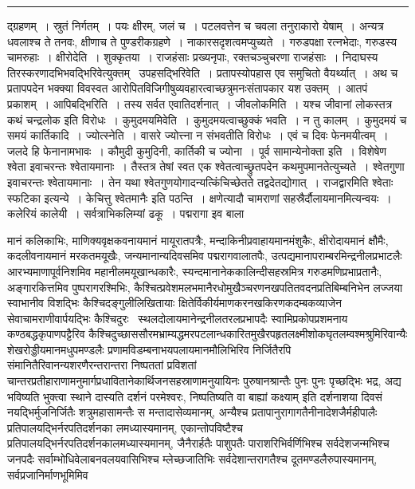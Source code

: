 \documentclass[11pt, openany]{book}
\begin{document}
\vspace{2mm}
\hrule

\noindent
{\s द्ग्रहणम्~। स्रुतं निर्गतम्~। पयः क्षीरम्, जलं च~। पटलवत्तेन च चवला तनुराकारो येषाम्~। अन्यत्र धवलाश्च ते तनवः, क्षीणाच ते पुण्डरीकग्रहणे~। नाकारसदृशत्वमप्युच्यते~। गरुडपक्षा रत्नभेदाः, गरुडस्य चामरुहाः~। {\qtt क्षीरोदेति}~। शुक्कृतया~। राजहंसाः प्रख्यनृपाः, रक्तचञ्चुचरणा राजहंसाः~। निदाघस्य तिरस्करणादभिभवद्भिरिवेत्युक्तम् \textendash\ {\qtt उपहसद्भिरिवेति}~। प्रतापस्योपहास एव समुचितो वैयर्थ्यात्~। अथ च प्रतापपदेन भक्क्या विवस्वत आरोपितविजिगीषुव्यवहारत्वाच्छत्रुमनःसंतापकार यश उक्तम्~। आतपं प्रकाशम्~। {\qtt आपिबद्भिरिति}~। तस्य सर्वत एवातिदर्शनात्~। {\qtt जीवलोकमिति}~। यश्च जीवानां लोकस्तत्र कथं चन्द्रलोक इति विरोधः~। {\qtt कुमुदमयमिवेति}~। कुमुदमयत्वाच्छुक्कं भवति~। न तु कालम्~। कुमुदमयं च समयं कार्तिकादि~। {\qtt ज्योत्स्नेति}~। वासरे ज्योत्त्ना न संभवतीति विरोधः~। एवं च दिवः फेनमयीत्वम्~। जलदे हि फेनानामभावः~। कौमुदी कुमुदिनी, कार्तिकी च ज्योना~। पूर्व सामान्येनोक्ता इति~। विशेषेण श्वेता इवाचरन्तः श्वेतायमानाः~। तैस्तत्र तेषां स्वत एक श्वेतत्वाच्छ्रुतपदेन कथमुपमानतेत्युच्यते~। श्वेतगुणा इवाचरन्तः श्वेतायमानाः~। तेन यथा श्वेतगुणयोगादन्यत्किंचिच्छेतते तद्वदेतद्योगात्~। राजद्वारमिति श्वेताः स्फटिका इत्यन्ये~। केचित्तु {\qt श्वेतमानैः} इति पठन्ति~। क्षणेत्यादौ चामराणां सहस्रैर्दौलायमानमित्यन्वयः~। कलेरियं कालेयी~। सर्वत्राभिकलिम्यां ढकू~। पद्मरागा इव बाला}

\newpage

\noindent
मानं कलिकाभिः, माणिक्यवृक्षकवनायमानं मायूरातपत्रैः, मन्दाकिनीप्रवाहायमानमंशुकैः, क्षीरोदायमानं क्षौमैः, कदलीवनायमानं मरकतमयूखैः, जन्यमानान्यदिवसमिव पद्मरागवालातपैः, उत्पद्यमानापराम्बरमिन्द्रनीलप्रभाटलैः आरभ्यमाणापूर्वनिशमिव महानीलमयूखान्धकारैः, स्यन्दमानानेककालिन्दीसहस्रमित्र गरुडमणिप्रभाप्रतानैः, अङ्गारकित्तमिव पुष्परागरश्मिभिः, कैश्चित्प्रवेशमलभमानैरधोमुखैञ्चरणनखपतितवदनप्रतिबिम्बनिभेन लज्जया स्वाभानीव विशद्भिः कैश्चिदङ्गुलीलिखितायाः क्षितेर्विकीर्यमाणकरनखकिरणकदम्बकव्याजेन सेवाचामराणीवार्पयद्भिः कैश्चिदुरः \textendash\ स्थलदोलायमानेन्द्रनीलतरलप्रभापदैः स्वामिप्रकोपप्रशमनाय कण्ठबद्धकृपाणपट्टैरिव कैश्चिदुच्छाससौरमभ्राम्यद्धमरपटलान्धकारितमुखैरपहृतलक्ष्मीशोकघृतलम्वश्मश्रुमिरिवान्यैः शेखरोड्डीयमानमधुपमण्डलैः प्रणामविडम्बनाभयपलायमानमौलिभिरिव निर्जितैरपि संमानितैरिवानन्यशरणैरन्तरान्तरा निष्पततां प्रविशतां चान्तरप्रतीहाराणामनुमार्गप्रधावितानेकार्थिजनसहस्राणामनुयायिनः पुरुषानश्रान्तैः पुनः पुनः पृच्छद्भिः भद्र, अद्य भविष्यति भुक्त्वा स्थाने दास्यति दर्शनं परमेश्वरः, निष्पतिष्यति वा बाह्यां कक्ष्याम् इति दर्शनाशया दिवसं नयद्भिर्मुजनिर्जितैः शत्रुमहासामन्तैः स मन्तादासेव्यमानम्, अन्यैश्च प्रतापानुरागागतैनीनादेशजैर्महीपालैः प्रतिपालयद्भिर्नरपतिदर्शनका लमध्यास्यमानम्, एकान्तोपविष्टैश्च प्रतिपालयद्भिर्नरपतिदर्शनकालमध्यास्यमानम्, जैनैरार्हतैः पाशुपतैः पाराशरिभिर्वर्णिभिश्च सर्वदेशजन्मभिश्च जनपदैः सर्वाम्भोधिवेलाबनवलयवासिभिश्च म्लेच्छजातिभिः सर्वदेशान्तरागतैश्च दूतमण्डलैरुपास्यमानम्, सर्वप्रजानिर्माणभूमिमिव
\end{document}
